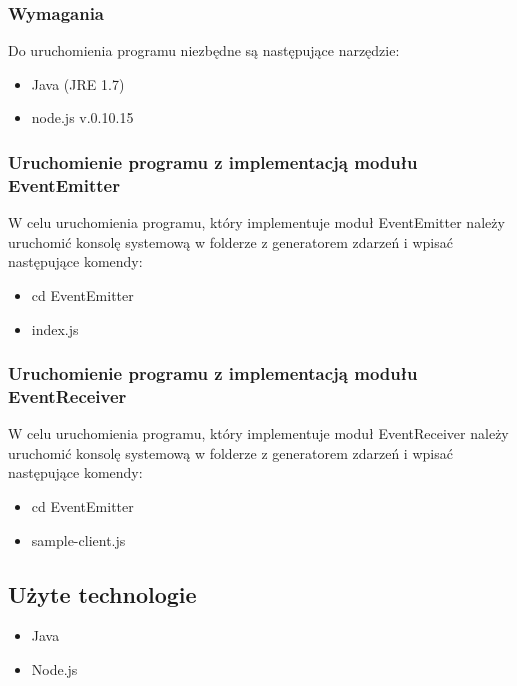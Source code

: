 \subsubsection{Wymagania}
Do uruchomienia programu niezbędne są następujące narzędzie:
\begin{itemize}[noitemsep]
  \item Java (JRE 1.7)
  \item node.js v.0.10.15
\end{itemize}
\subsubsection{Uruchomienie programu z implementacją modułu EventEmitter}
W celu uruchomienia programu, który implementuje moduł EventEmitter należy uruchomić konsolę systemową w folderze z generatorem zdarzeń i wpisać następujące komendy:
\begin{itemize}[noitemsep]
  \item cd EventEmitter
  \item index.js
\end{itemize}
\subsubsection{Uruchomienie programu z implementacją modułu EventReceiver}
W celu uruchomienia programu, który implementuje moduł EventReceiver należy uruchomić konsolę systemową w folderze z generatorem zdarzeń i wpisać następujące komendy:
\begin{itemize}[noitemsep]
  \item cd EventEmitter
  \item sample-client.js
\end{itemize}


\subsection{Użyte technologie}
\begin{itemize}[noitemsep]
  \item Java
  \item Node.js
\end{itemize}
